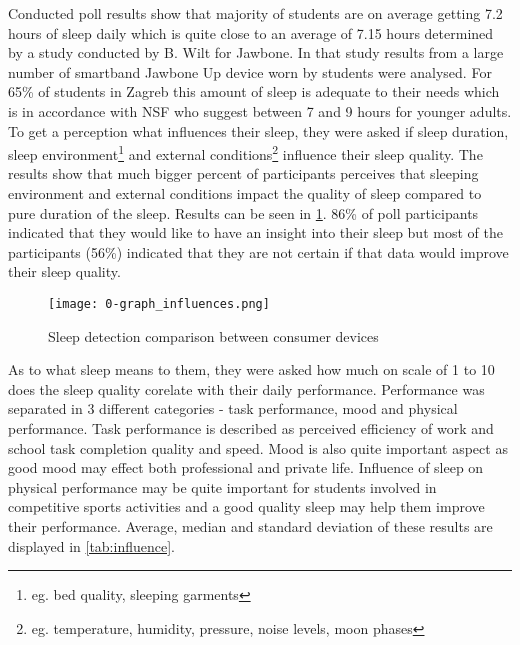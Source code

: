 Conducted poll results show that majority of students are on average getting 7.2 hours of sleep daily which is quite close to an average of 7.15 hours determined by a study conducted by B. Wilt for Jawbone\cite{Jawbone}. In that study results from a large number of smartband Jawbone Up device worn by students were analysed. For 65\% of students in Zagreb this amount of sleep is adequate to their needs which is in accordance with NSF who suggest between 7 and 9 hours for younger adults\cite{NSF}. To get a perception what influences their sleep, they were asked if sleep duration, sleep environment\footnote{eg. bed quality, sleeping garments} and external conditions\footnote{eg. temperature, humidity, pressure, noise levels, moon phases} influence their sleep quality. The results show that much bigger percent of participants perceives that sleeping environment and external conditions impact the quality of sleep compared to pure duration of the sleep. Results can be seen in \ref{fig:influence}. 86\% of poll participants indicated that they would like to have an insight into their sleep but most of the participants (56\%) indicated that they are not certain if that data would improve their sleep quality.

\begin{figure}[h]
  \begin{center}
    \texttt{[image: 0-graph\_influences.png]}
  \end{center}
  \caption{Sleep detection comparison between consumer devices}
  \label{fig:influence}
\end{figure}

As to what sleep means to them, they were asked how much on scale of 1 to 10 does the sleep quality corelate with their daily performance. Performance was separated in 3 different categories - task performance, mood and physical performance. Task performance is described as perceived efficiency of work and school task completion quality and speed. Mood is also quite important aspect as good mood may effect both professional and private life. Influence of sleep on physical performance may be quite important for students involved in competitive sports activities and a good quality sleep may help them improve their performance. Average, median and standard deviation of these results are displayed in \ref{tab:influence}.

